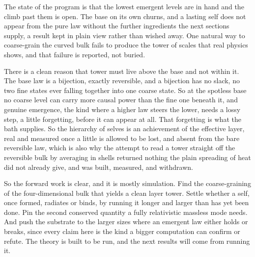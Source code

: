 The state of the program is that the lowest emergent levels are in hand and the climb past them is open. The base on its own churns, and a lasting self does not appear from the pure law without the further ingredients the next sections supply, a result kept in plain view rather than wished away. One natural way to coarse-grain the curved bulk fails to produce the tower of scales that real physics shows, and that failure is reported, not buried.

There is a clean reason that tower must live above the base and not within it. The base law is a bijection, exactly reversible, and a bijection has no slack, no two fine states ever falling together into one coarse state. So at the spotless base no coarse level can carry more causal power than the fine one beneath it, and genuine emergence, the kind where a higher law steers the lower, needs a lossy step, a little forgetting, before it can appear at all. That forgetting is what the bath supplies. So the hierarchy of selves is an achievement of the effective layer, real and measured once a little is allowed to be lost, and absent from the bare reversible law, which is also why the attempt to read a tower straight off the reversible bulk by averaging in shells returned nothing the plain spreading of heat did not already give, and was built, measured, and withdrawn.

So the forward work is clear, and it is mostly simulation. Find the coarse-graining of the four-dimensional bulk that yields a clean layer tower. Settle whether a self, once formed, radiates or binds, by running it longer and larger than has yet been done. Pin the second conserved quantity a fully relativistic massless mode needs. And push the substrate to the larger sizes where an emergent law either holds or breaks, since every claim here is the kind a bigger computation can confirm or refute. The theory is built to be run, and the next results will come from running it.
